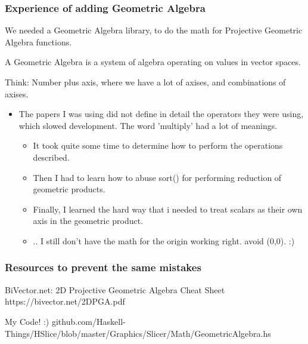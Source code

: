 \documentclass[hyperref={pdfpagemode=FullScreen},aspectratio=169]{beamer}
\begin{document}
\begin{frame}
  \frametitle{Experience of adding Geometric Algebra}
  We needed a Geometric Algebra library, to do the math for Projective Geometric Algebra functions.\par
  A Geometric Algebra is a system of algebra operating on values in vector spaces. \par
  Think: Number plus axis, where we have a lot of axises, and combinations of axises.
  \begin{itemize}
  \item The papers I was using did not define in detail the operators they were using, which slowed development. The word 'multiply' had a lot of meanings.
    \begin{itemize}
    \item It took quite some time to determine how to perform the operations described.
    \item Then I had to learn how to abuse sort() for performing reduction of geometric products.
    \item Finally, I learned the hard way that i needed to treat scalars as their own axis in the geometric product.
    \item .. I still don't have the math for the origin working right. avoid (0,0). :)
    \end{itemize}
  \end{itemize}
\end{frame}

\begin{frame}
  \frametitle{Resources to prevent the same mistakes}
  \begin{block}{BiVector.net: 2D Projective Geometric Algebra Cheat Sheet}
    https://bivector.net/2DPGA.pdf
  \end{block}
  \begin{block}{My Code! :)}
    github.com/Haskell-Things/HSlice/blob/master/Graphics/Slicer/Math/GeometricAlgebra.hs
  \end{block}
\end{frame}
\end{document}
